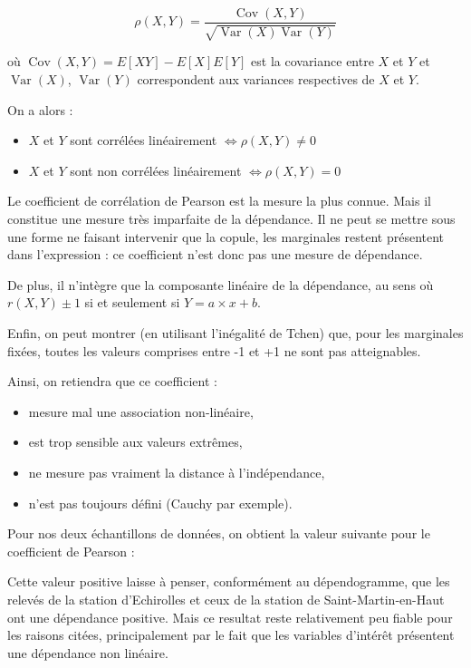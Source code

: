 $$
\rho(X,Y) = \frac{\operatorname{Cov}(X,Y)}{\sqrt{ \operatorname{Var}(X) \operatorname{Var}(Y)}}
$$

où $\operatorname{Cov}(X,Y) = E[XY] - E[X] E[Y]$ est la covariance entre $X$ et $Y$ et $\operatorname{Var}(X)$, $\operatorname{Var}(Y)$ correspondent aux variances respectives
de $X$ et $Y$.

On a alors :

\begin{itemize}
\item $X$ et $Y$ sont corrélées linéairement $\Longleftrightarrow \rho(X,Y) \neq 0$
\item $X$ et $Y$ sont non corrélées linéairement $\Longleftrightarrow \rho(X,Y) = 0$
\end{itemize}

Le coefficient de corrélation de Pearson est la mesure la plus connue. Mais il constitue une mesure très imparfaite de la dépendance. Il ne
peut se mettre sous une forme ne faisant intervenir que la copule, les marginales restent présentent dans l’expression : ce coefficient n’est donc
pas une mesure de dépendance.

De plus, il n’intègre que la composante linéaire de la dépendance, au sens où $r(X,Y) \pm 1$ si et seulement si $Y= a \times x + b$.

Enfin, on peut montrer (en utilisant l'inégalité de Tchen) que, pour les marginales fixées, toutes les valeurs
comprises entre -1 et +1 ne sont pas atteignables.

Ainsi, on retiendra que ce coefficient :

\begin{itemize}
\item mesure mal une association non-linéaire,
\item est trop sensible aux valeurs extrêmes,
\item ne mesure pas vraiment la distance à l'indépendance,
\item n'est pas toujours défini (Cauchy par exemple).
\end{itemize}

Pour nos deux échantillons de données, on obtient la valeur suivante pour le coefficient de Pearson :

\begin{center}
\end{center}

Cette valeur positive laisse à penser, conformément au dépendogramme, que les relevés de la station d'Echirolles et ceux de la station de Saint-Martin-en-Haut ont une dépendance positive. Mais ce resultat reste relativement peu fiable pour les raisons citées, principalement par le fait que les variables d'intérêt présentent une dépendance non linéaire.


